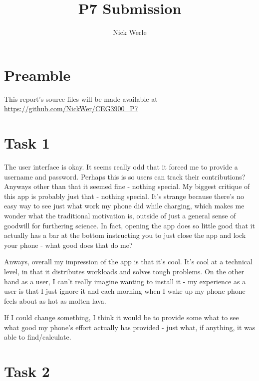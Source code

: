 \documentclass{article}
\author{Nick Werle}
\title{P7 Submission}
\begin{document}
\maketitle
\section{Preamble}
This report's source files will be made available at \url{https://github.com/NickWer/CEG3900_P7}

\section{Task 1}
The user interface is okay. It seems really odd that it forced me to provide a username and password. Perhaps this is so users can track their contributions? Anyways other than that it seemed fine - nothing special.
My biggest critique of this app is probably just that - nothing special.
It's strange because there's no easy way to see just what work my phone did while charging, which makes me wonder what the traditional motivation is, outside of just a general sense of goodwill for furthering science.
In fact, opening the app does so little good that it actually has a bar at the bottom instructing you to just close the app and lock your phone - what good does that do me?

Anways, overall my impression of the app is that it's cool. It's cool at a technical level, in that it distributes workloads and solves tough problems.
On the other hand as a user, I can't really imagine wanting to install it - my experience as a user is that I just ignore it and each morning when I wake up my phone phone feels about as hot as molten lava.

If I could change something, I think it would be to provide some what to see what good my phone's effort actually has provided - just what, if anything, it was able to find/calculate.

\section{Task 2}
\end{document}
